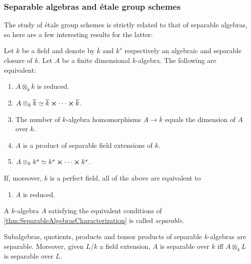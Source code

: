 \subsubsection{Separable algebras and étale group schemes}
The study of étale group schemes is strictly related to that of
separable algebras, so here are a few interesting results for the latter:


\begin{thm}
	\label{thm:SeparableAlgebrasCharacterization}
	Let $k$ be a field and denote by $\overline{k}$ and $k^s$ respectively
	an algebraic and separable closure of $k$.
	Let $A$ be a finite dimensional $k$-algebra.
	The following are equivalent:
\begin{enumerate}
	\item $A \otimes_k \overline{k}$ is reduced.
	\item $A \otimes_k \overline{k} \simeq \overline{k} \cross \cdots \cross \overline{k}$.
	\item The number of $k$-algebra homomorphisms $A \to  \overline{k}$
		equals the dimension of $A$ over $k$.
	\item $A$ is a product of separable field extensions of $k$.
	\item $A \otimes_k k^s \simeq k^s \cross \cdots \cross k^s$.
\end{enumerate}
If, moreover, $k$ is a perfect field, all of the above are equivalent to
\begin{enumerate}[resume]
	\item $A$ is reduced.
\end{enumerate}
\end{thm}


\begin{defn}
	A $k$-algebra $A$ satisfying the equivalent conditions of
	\cref{thm:SeparableAlgebrasCharacterization}
	is called {\em separable}.
\end{defn}


\begin{cor}
	Subalgebras, quotients, products and tensor products of separable $k$-algebras
	are separable.
	Moreover, given $L/k$ a field extension, $A$ is separable over $k$
	iff $A \otimes_k L$ is separable over $L$.
\end{cor} 


